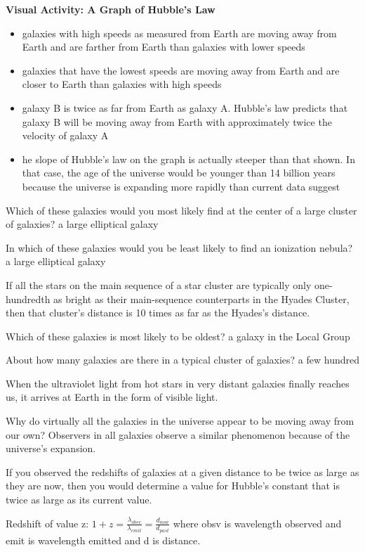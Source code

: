 \textbf{Visual Activity: A Graph of Hubble’s Law}
\begin{itemize}
\item galaxies with high speeds as measured from Earth are moving away from Earth and are farther from Earth than galaxies with lower speeds
\item galaxies that have the lowest speeds are moving away from Earth and are closer to Earth than galaxies with high speeds
\item galaxy B is twice as far from Earth as galaxy A. Hubble’s law predicts that galaxy B will be moving away from Earth with approximately twice the velocity of galaxy A
\item he slope of Hubble’s law on the graph is actually steeper than that shown. In that case, the age of the universe would be younger than 14 billion years because the universe is expanding more rapidly than current data suggest
\end{itemize}

Which of these galaxies would you most likely find at the center of a large cluster of galaxies? a large elliptical galaxy

In which of these galaxies would you be least likely to find an ionization nebula? a large elliptical galaxy

If all the stars on the main sequence of a star cluster are typically only one-hundredth as bright as their main-sequence counterparts in the Hyades Cluster, then that cluster's distance is 10 times as far as the Hyades's distance.

Which of these galaxies is most likely to be oldest? a galaxy in the Local Group

About how many galaxies are there in a typical cluster of galaxies?  a few hundred

When the ultraviolet light from hot stars in very distant galaxies finally reaches us, it arrives at Earth in the form of visible light.

Why do virtually all the galaxies in the universe appear to be moving away from our own? Observers in all galaxies observe a similar phenomenon because of the universe's expansion.

If you observed the redshifts of galaxies at a given distance to be twice as large as they are now, then you would determine a value for Hubble's constant that is twice as large as its current value.

Redshift of value z: $1+z=\frac{\lambda_{obsv}}{\lambda_{emit}} = \frac{d_{now}}{d_{past}}$ where obsv is wavelength observed and emit is wavelength emitted and d is distance.


